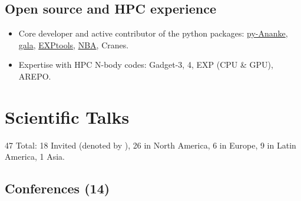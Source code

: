 \documentclass[UTF8]{article}
\begin{document}
\subsection*{Open source and HPC experience}

\begin{itemize}
  \setlength\itemsep{0.0em}
  \renewcommand\labelitemi{$\cdot$}
  \item Core developer and active contributor of the python packages:
    \href{https://github.com/athob/py-ananke}{py-Ananke},
    \href{https://gala.adrian.pw/en/latest/}{gala},
    \href{https://github.com/EXP-code/EXP_tools}{EXPtools}, 
    \href{https://github.com/jngaravitoc/nba}{NBA}, Cranes. 
  \item Expertise with HPC N-body codes: Gadget-3, 4, EXP (CPU \& GPU), AREPO.  

\end{itemize}
\section*{Scientific Talks}

47 Total: 18 Invited (denoted by \dag), 26 in North America, 6 in Europe, 9 in Latin America, 1 Asia.\\


\subsection*{Conferences (14)}
\end{document}
